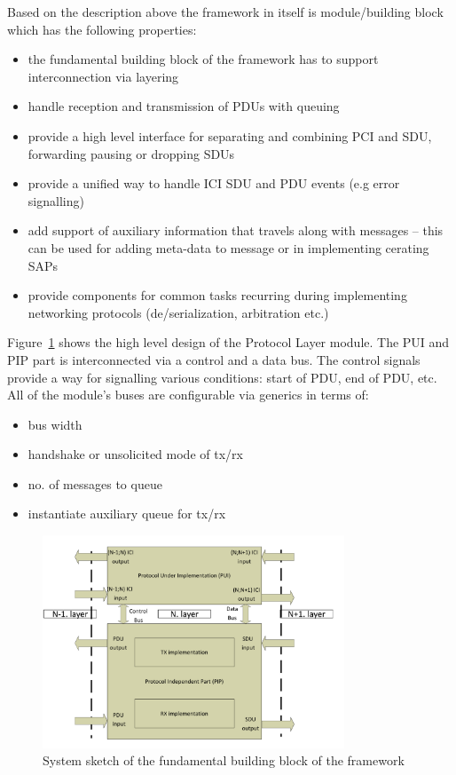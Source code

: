 \documentclass[conference]{IEEEtran}
\begin{document}
Based on the description above the framework in itself is module/building block which has the following properties: 

\begin{itemize}
\renewcommand \labelitemi{--}
\item the fundamental building block of the framework has to support interconnection via layering
\item handle reception and transmission of PDUs with queuing 
\item provide a high level interface for separating and combining PCI and SDU, forwarding pausing or dropping SDUs
\item provide a unified way to handle ICI SDU and PDU events (e.g error signalling)
\item add support of auxiliary information that travels along with messages -- this can be used for adding meta-data to message or in implementing cerating SAPs
\item provide components for common tasks recurring during implementing networking protocols (de/serialization, arbitration etc.)
\end{itemize}

Figure~\ref{fig:system_sketch} shows the high level design of the Protocol Layer module. The PUI and PIP part is interconnected via a control and a data bus. The control signals provide a way for signalling various conditions: start of PDU, end of PDU, etc. All of the module's buses are configurable via generics in terms of:
\begin{itemize}
\renewcommand \labelitemi{--}
\item bus width
\item handshake or unsolicited mode of tx/rx
\item no. of messages to queue
\item instantiate auxiliary queue for tx/rx
\end{itemize}

\begin{figure}[!htb]
    \centering
    \includegraphics[width=9cm]{figures_raw/system_sketch.pdf}
    \caption{System sketch of the fundamental building block of the framework}
    \label{fig:system_sketch}
\end{figure}
\end{document}
